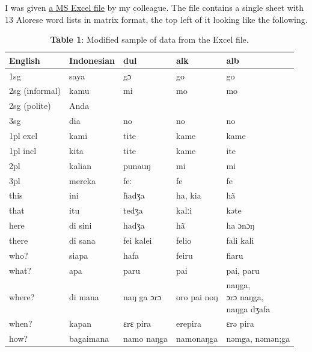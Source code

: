 \documentclass[
  a4paper,
  14pt,
  oneside,
  tablecaptionabove
]{scrbook}
\begin{document}
I was given
\href{https://github.com/Anaphory/matrix_to_beastling/blob/master/Wordlists.xlsx}{a
MS Excel file} by my colleague. The file contains a single sheet with 13
Alorese word lists in matrix format, the top left of it looking like the
following.


\begin{table}[]
\centering
\begin{tabular}{@{}lllll@{}}
\toprule
English        & Indonesian & dul        & alk         & alb                           \\ \midrule
1sg            & saya       & gɔ         & go          & go                            \\
2sg (informal) & kamu       & mi         & mo          & mo                            \\
2sg (polite)   & Anda       &            &             &                               \\
3sg            & dia        & no         & no          & no                            \\
1pl excl       & kami       & tite       & kame        & kame                          \\
1pl incl       & kita       & tite       & kame        & ite                           \\
2pl            & kalian     & punauŋ     & mi          & mi                            \\
3pl            & mereka     & feː        & fe          & fe                            \\
this           & ini        & h̃adʒa     & ha, kia     & hã                            \\
that           & itu        & tedʒa      & kalːi       & kəte                          \\
here           & di sini    & hadʒa      & hã          & ha ɔnɔŋ                       \\
there          & di sana    & fei kalei  & felio       & fali kali                     \\
who?           & siapa      & hafa       & feiru       & fiaru                         \\
what?          & apa        & paru       & pai         & pai, paru                     \\
where?         & di mana    & naŋ ga ɔrɔ & oro pai noŋ & \makecell[l]{naŋga,\\ɔrɔ naŋga,\\naŋga dʒafa} \\
when?          & kapan      & ɛrɛ pira   & erepira     & ɛrə pira                      \\
how?           & bagaimana  & namo naŋga & namonaŋga   & nəmga, nəmən;ga               \\ \bottomrule
\end{tabular}
\captionsetup{justification=centering}
\caption*{\small \textbf{Table 1}: Modified sample of data from the Excel file.}
\end{table}
\end{document}
